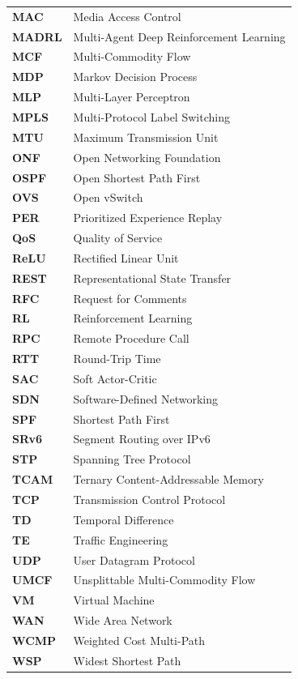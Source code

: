 \documentclass[12pt,a4paper,oneside]{report}
\begin{document}
\begin{tabular}{ll}
\textbf{MAC} & Media Access Control \\
\textbf{MADRL} & Multi-Agent Deep Reinforcement Learning \\
\textbf{MCF} & Multi-Commodity Flow \\
\textbf{MDP} & Markov Decision Process \\
\textbf{MLP} & Multi-Layer Perceptron \\
\textbf{MPLS} & Multi-Protocol Label Switching \\
\textbf{MTU} & Maximum Transmission Unit \\
\textbf{ONF} & Open Networking Foundation \\
\textbf{OSPF} & Open Shortest Path First \\
\textbf{OVS} & Open vSwitch \\
\textbf{PER} & Prioritized Experience Replay \\
\textbf{QoS} & Quality of Service \\
\textbf{ReLU} & Rectified Linear Unit \\
\textbf{REST} & Representational State Transfer \\
\textbf{RFC} & Request for Comments \\
\textbf{RL} & Reinforcement Learning \\
\textbf{RPC} & Remote Procedure Call \\
\textbf{RTT} & Round-Trip Time \\
\textbf{SAC} & Soft Actor-Critic \\
\textbf{SDN} & Software-Defined Networking \\
\textbf{SPF} & Shortest Path First \\
\textbf{SRv6} & Segment Routing over IPv6 \\
\textbf{STP} & Spanning Tree Protocol \\
\textbf{TCAM} & Ternary Content-Addressable Memory \\
\textbf{TCP} & Transmission Control Protocol \\
\textbf{TD} & Temporal Difference \\
\textbf{TE} & Traffic Engineering \\
\textbf{UDP} & User Datagram Protocol \\
\textbf{UMCF} & Unsplittable Multi-Commodity Flow \\
\textbf{VM} & Virtual Machine \\
\textbf{WAN} & Wide Area Network \\
\textbf{WCMP} & Weighted Cost Multi-Path \\
\textbf{WSP} & Widest Shortest Path \\
\end{tabular}
\end{document}
